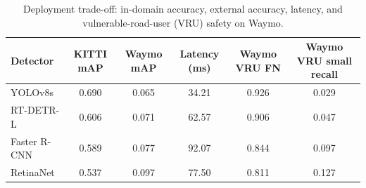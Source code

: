 \begin{table}[t]
    \centering
    \caption{Deployment trade-off: in-domain accuracy, external accuracy, latency, and vulnerable-road-user (VRU) safety on Waymo.}
    \label{tab:deployment}
    \begin{tabular}{lccccc}
        \toprule
        Detector & KITTI mAP & Waymo mAP & Latency (ms) & Waymo VRU FN & Waymo VRU small recall \\
        \midrule
        YOLOv8s & 0.690 & 0.065 & 34.21 & 0.926 & 0.029 \\
        RT-DETR-L & 0.606 & 0.071 & 62.57 & 0.906 & 0.047 \\
        Faster R-CNN & 0.589 & 0.077 & 92.07 & 0.844 & 0.097 \\
        RetinaNet & 0.537 & 0.097 & 77.50 & 0.811 & 0.127 \\
        \bottomrule
    \end{tabular}
\end{table}
